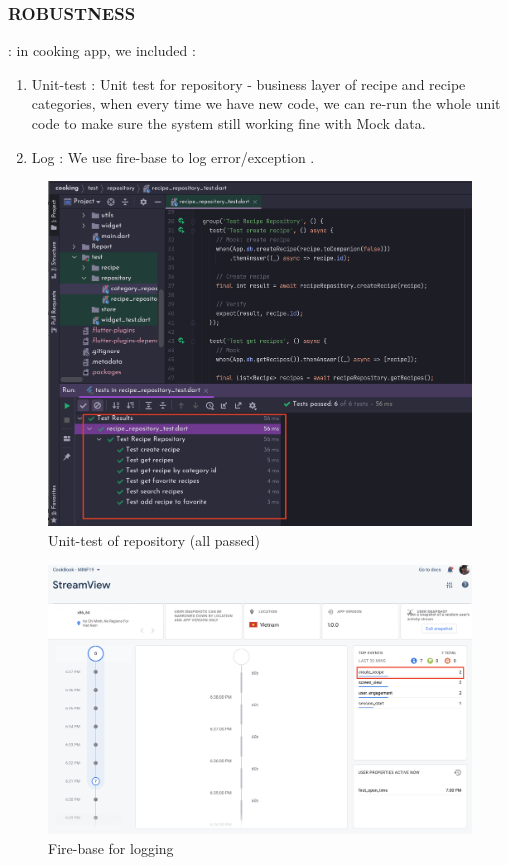\documentclass{article}
\begin{document}
 \subsubsection{ROBUSTNESS}  :  in cooking app, we included : 
 \begin{enumerate}
 \item Unit-test : Unit test for repository - business layer of recipe and recipe categories, when every time we have new code, we can re-run the whole unit code to make sure the system still working fine with Mock data.
 \item Log : We use fire-base to log error/exception .
 \end{enumerate}
 \begin{figure}[h!]
    \centering
    \includegraphics[scale=0.2]{Images/unit-test-repo.png}
    \caption{Unit-test of repository (all passed)}
    \label{fig:cookingbook}
\end{figure}
\begin{figure}[h!]
    \centering
    \includegraphics[scale=0.2]{Images/firebaselog.png}
    \caption{Fire-base for logging}
    \label{fig:cookingbook}
\end{figure}
\end{document}
